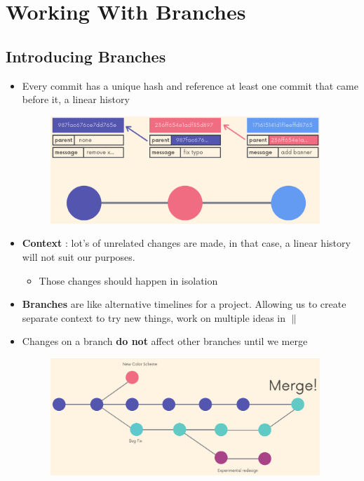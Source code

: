 \documentclass{report}
\begin{document}
\chapter{Working With Branches}


\section{Introducing Branches}
\begin{itemize}
	\item Every commit has a unique hash and reference at least one commit that came before it, a linear history
\begin{figure}[H] 
	 \centering 
	 \includegraphics[width=4in]{screenshots/2022-06-28T00-13-49Z.png} 
\end{figure}
	\item \textbf{Context} : lot's of unrelated changes are made, in that case, a linear history will not suit our purposes.
		\begin{itemize}
			\item Those changes should happen in isolation 
		\end{itemize}
	\item \textbf{Branches} are like alternative timelines for a project. Allowing us to create separate context to try new things, work on multiple ideas in $ \| $  
	\item Changes on a branch \textbf{do not} affect other branches until we merge 
		\begin{figure}[H] 
	 \centering 
	 \includegraphics[width=4in]{screenshots/2022-06-28T00-24-00Z.png} 
 \end{figure}
\end{itemize}
\end{document}
